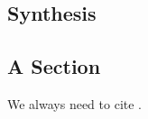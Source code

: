 \begin{multicols}{2}
\section{Synthesis}

\subsection*{A Section}

We always need to cite .

\lipsum[1-5]

\end{multicols}